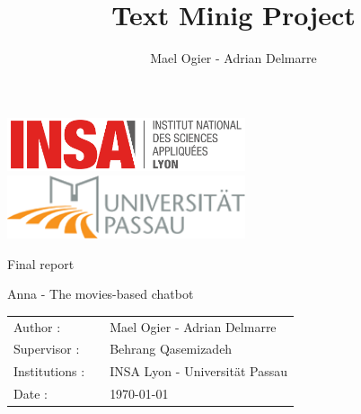 \documentclass[a4paper]{article}
\title{Text Minig Project}
\author{Mael Ogier - Adrian Delmarre}
\begin{document}
\thispagestyle{empty}
\newpage


\begin{center}
\includegraphics[width=7cm]{Logo_INSA_Lyon_2014.png} \includegraphics[width=7cm]{logoPassau.png} \\

\vspace{6cm}

{ \fontsize{29pt}{0} \selectfont%
Final report
}
\vspace{2cm}

{ \fontsize{18.0pt}{0} \selectfont
Anna - The movies-based chatbot
}

\vspace{8cm}

{\fontsize{13pt}{12} \selectfont%
\begin{tabular}{lcl}

Author :&& Mael Ogier - Adrian Delmarre\\[1ex]
Supervisor :&& Behrang Qasemizadeh\\[1ex]

Institutions :&& INSA Lyon - Universität Passau\\[1ex]
Date : && \today
\end{tabular}
}

\end{center}
\clearpage

\pagestyle{fancy}
\lhead{}
\chead{}
\rhead{}
\cfoot{\thepage}
\renewcommand\headrulewidth{0pt}
\renewcommand\footrulewidth{0pt}

\renewcommand{\contentsname}{Summary}
\tableofcontents




\end{document}
